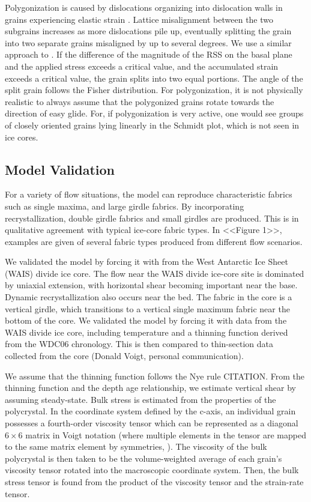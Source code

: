 \documentclass{igs}
\begin{document}
Polygonization is caused by dislocations organizing into dislocation walls in grains experiencing elastic strain \citep{duval1995}. Lattice misalignment between the two subgrains increases as more dislocations pile up, eventually splitting the grain into two separate grains misaligned by up to several degrees. We use a similar approach to \citet{thorsteinsson2002nni}. If the difference of the magnitude of the RSS on the basal plane and the applied stress exceeds a critical value, and the accumulated strain exceeds a critical value, the grain splits into two equal portions. The angle of the split grain follows the Fisher distribution. For polygonization, it is not physically realistic to always assume that the polygonized grains rotate towards the direction of easy glide. For, if polygonization is very active, one would see groups of closely oriented grains lying linearly in the Schmidt plot, which is not seen in ice cores. 

\subsection{Model Validation}
For a variety of flow situations, the model can reproduce characteristic fabrics such as single maxima, and large girdle fabrics. By incorporating recrystallization, double girdle fabrics and small girdles are produced. This is in qualitative agreement with typical ice-core fabric types. In <<Figure 1>>, examples are given of several fabric types produced from different flow scenarios. 

We validated the model by forcing it with from the West Antarctic Ice Sheet (WAIS) divide ice core. The flow near the WAIS divide ice-core site is dominated by uniaxial extension, with horizontal shear becoming important near the base. Dynamic recrystallization also occurs near the bed. The fabric in the core is a vertical girdle, which transitions to a vertical single maximum fabric near the bottom of the core. We validated the model by forcing it with data from the WAIS divide ice core, including temperature and a thinning function derived from the WDC06 chronology. This is then compared to thin-section data collected from the core (Donald Voigt, personal communication).

We assume that the thinning function follows the Nye rule CITATION. From the thinning function and the depth age relationship, we estimate vertical shear by assuming steady-state. Bulk stress is estimated from the properties of the polycrystal. In the coordinate system defined by the c-axis, an individual grain possesses a fourth-order viscosity tensor which can be represented as a diagonal $6 \times 6$ matrix in Voigt notation (where multiple elements in the tensor are mapped to the same matrix element by symmetries, \citet{vnote}). The viscosity of the bulk polycrystal is then taken to be the volume-weighted average of each grain's viscosity tensor rotated into the macroscopic coordinate system. Then, the bulk stress tensor is found from the product of the viscosity tensor and the strain-rate tensor. 
\end{document}
